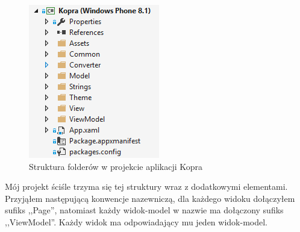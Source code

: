 \documentclass[a4paper,twoside,titlepage,openright]{book}
\begin{document}
\begin{figure}[htp]
	\centering
			\includegraphics[resolution=120]{strukturaFolderow.png}
		\caption{Struktura folderów w projekcie aplikacji Kopra}
\end{figure}

Mój projekt ściśle trzyma się tej struktury wraz z dodatkowymi elementami. Przyjąłem następującą konwencje nazewniczą, dla każdego widoku dołączyłem sufiks ,,Page'', natomiast każdy widok-model w nazwie ma dołączony sufiks ,,ViewModel''. Każdy widok ma odpowiadający mu jeden widok-model. 
\end{document}
